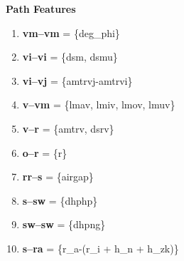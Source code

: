\documentclass{report} %
\begin{document}
\textbf{Path Features}

\begin{enumerate}

    \item \textbf{vm--vm} = \{deg\_phi\}

    \item \textbf{vi--vi} = \{dsm, dsmu\}

    \item \textbf{vi--vj} = \{amtrvj-amtrvi\}

    \item \textbf{v--vm} = \{lmav, lmiv, lmov, lmuv\}

    \item \textbf{v--r} = \{amtrv, dsrv\}
    
    \item \textbf{o--r} = \{r\}

    \item \textbf{rr--s} = \{airgap\}

    \item \textbf{s--sw} = \{dhphp\}
    
    \item \textbf{sw--sw} = \{dhpng\}
    
    \item \textbf{s--ra} = \{r\_a-(r\_i + h\_n + h\_zk)\}
    
\end{enumerate}


\listoffigures

\newpage 

\newpage 

\listoftables

\newpage 

\newpage 
\end{document}
